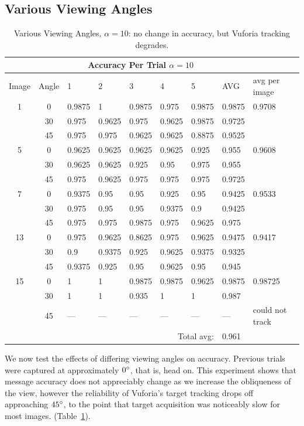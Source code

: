 \documentclass[11pt, letterpaper]{article}
\begin{document}
\subsection{Various Viewing Angles}
\begin{table}[t]
\caption{Various Viewing Angles, $\alpha=10$: no change in accuracy, but Vuforia tracking degrades.}
\label{tab:angles}
\centering
\begin{tabular}{c c | l l l l l l l}
\\
&& \multicolumn{5}{c}{Accuracy Per Trial $\alpha=10$}&&\\
\toprule
Image&Angle&1&2&3&4&5&AVG&avg per image\\
\midrule
1&0&0.9875&1&0.9875&0.975&0.9875&0.9875&0.9708\\
&30&0.975&0.9625&0.975&0.9625&0.9875&0.9725&\\
&45&0.975&0.975&0.9625&0.9625&0.8875&0.9525&\\
5&0&0.9625&0.9625&0.9625&0.9625&0.925&0.955&0.9608\\
&30&0.9625&0.9625&0.925&0.95&0.975&0.955&\\
&45&0.975&0.9625&0.975&0.975&0.975&0.9725&\\
7&0&0.9375&0.95&0.95&0.925&0.95&0.9425&0.9533\\
&30&0.975&0.95&0.95&0.9375&0.9&0.9425&\\
&45&0.975&0.975&0.9875&0.975&0.9625&0.975&\\
13&0&0.975&0.9625&0.8625&0.975&0.9625&0.9475&0.9417\\
&30&0.9&0.9375&0.925&0.9625&0.9375&0.9325&\\
&45&0.9375&0.925&0.95&0.9625&0.95&0.945&\\
15&0&1&1&0.9875&0.9875&0.9625&0.9875&0.98725\\
&30&1&1&0.935&1&1&0.987&\\
&45&---&---&---&---&---&---&could not track\\ 
\bottomrule
&&&&&\multicolumn{2}{r}{Total avg:}&0.961&\\
\end{tabular}
\end{table}

We now test the effects of differing viewing angles on accuracy. Previous trials were captured at approximately $0 \degree$, that is, head on. This experiment shows that message accuracy does not appreciably change as we increase the obliqueness of the view, however the reliability of Vuforia's target tracking drops off approaching $45 \degree$, to the point that target acquisition was noticeably slow for most images. (Table~\ref{tab:angles}).
\end{document}
